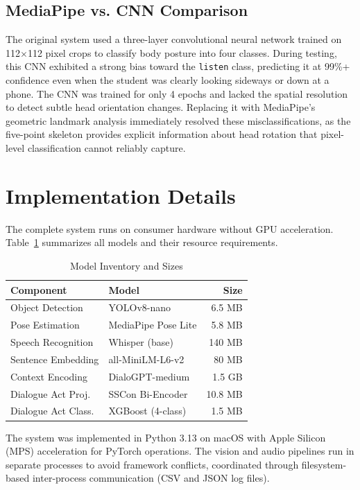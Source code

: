 \documentclass[conference]{IEEEtran}
\begin{document}
\subsection{MediaPipe vs. CNN Comparison}
The original system used a three-layer convolutional neural network trained on 112$\times$112 pixel crops to classify body posture into four classes. During testing, this CNN exhibited a strong bias toward the \texttt{listen} class, predicting it at 99\%+ confidence even when the student was clearly looking sideways or down at a phone. The CNN was trained for only 4 epochs and lacked the spatial resolution to detect subtle head orientation changes. Replacing it with MediaPipe's geometric landmark analysis immediately resolved these misclassifications, as the five-point skeleton provides explicit information about head rotation that pixel-level classification cannot reliably capture.

\section{Implementation Details}

The complete system runs on consumer hardware without GPU acceleration. Table~\ref{tab:models} summarizes all models and their resource requirements.

\begin{table}[htbp]
\caption{Model Inventory and Sizes}
\begin{center}
\begin{tabular}{|l|l|r|}
\hline
\textbf{Component} & \textbf{Model} & \textbf{Size} \\
\hline
Object Detection & YOLOv8-nano & 6.5 MB \\
Pose Estimation & MediaPipe Pose Lite & 5.8 MB \\
Speech Recognition & Whisper (base) & 140 MB \\
Sentence Embedding & all-MiniLM-L6-v2 & 80 MB \\
Context Encoding & DialoGPT-medium & 1.5 GB \\
Dialogue Act Proj. & SSCon Bi-Encoder & 10.8 MB \\
Dialogue Act Class. & XGBoost (4-class) & 1.5 MB \\
\hline
\end{tabular}
\label{tab:models}
\end{center}
\end{table}

The system was implemented in Python 3.13 on macOS with Apple Silicon (MPS) acceleration for PyTorch operations. The vision and audio pipelines run in separate processes to avoid framework conflicts, coordinated through filesystem-based inter-process communication (CSV and JSON log files).
\end{document}
